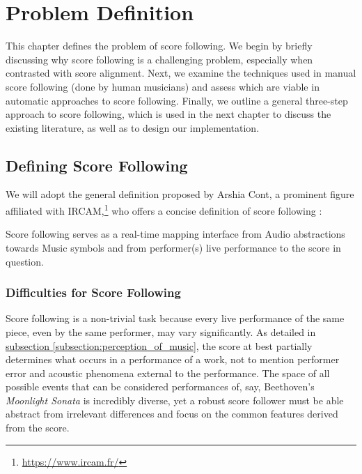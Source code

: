 \chapter{Problem Definition}{\label{ch:problem_definition}}


This chapter defines the problem of score following. We begin by briefly discussing why score following is a challenging problem, especially when contrasted with score alignment. Next, we examine the techniques used in manual score following (done by human musicians) and assess which are viable in automatic approaches to score following. Finally, we outline a general three-step approach to score following, which is used in the next chapter to discuss the existing literature, as well as to design our implementation.

\section{Defining Score Following}
We will adopt the general definition proposed by Arshia Cont, a prominent figure affiliated with IRCAM,\footnote{\href{https://www.ircam.fr/}{https://www.ircam.fr/}} who offers a concise definition of score following \cite{cont_arshia}:

\begin{definition}
   Score following serves as a real-time mapping interface from Audio abstractions towards Music symbols and from performer(s) live performance to the score in question.
\end{definition}


\subsection{Difficulties for Score Following}

Score following is a non-trivial task because every live performance of the same piece, even by the same performer, may vary significantly. As detailed in \hyperref[subsection:perception_of_music]{subsection \ref*{subsection:perception_of_music}}, the score at best partially determines what occurs in a performance of a work, not to mention performer error and acoustic phenomena external to the performance. The space of all possible events that can be considered performances of, say, Beethoven's \textit{Moonlight Sonata} is incredibly diverse, yet a robust score follower must be able abstract from irrelevant differences and focus on the common features derived from the score.

